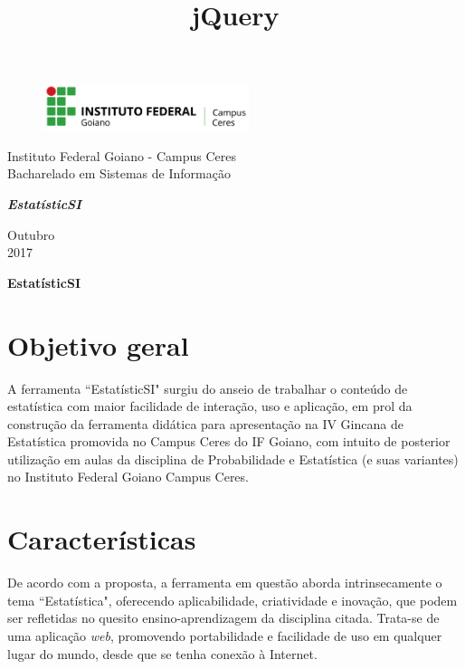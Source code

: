 \documentclass[12pt,a4paper]{article}
\title{jQuery}
\begin{document}
\begin{titlepage}

\begin{center}
\begin{figure}[htb]
		
		\label{figura:LogoIF}
	
		\centering
		\includegraphics[width=6cm]{logo.png} 
\end{figure}


Instituto Federal Goiano - Campus Ceres\\
Bacharelado em Sistemas de Informação\\\vspace{8.0cm}

\textit{\textbf{\Large{EstatísticSI}}}\\\vspace{8.5cm}

Outubro\\
2017\\
\end{center}
\end{titlepage}

\tableofcontents

\newpage
\begin{center}
\textbf{\Large{EstatísticSI}}\\\vspace{0.5cm}
\end{center}
\section{Objetivo geral}%

A ferramenta ``EstatísticSI"  surgiu do anseio de trabalhar o conteúdo de estatística com maior facilidade de interação, uso e aplicação, em prol da construção da ferramenta didática para apresentação na IV Gincana de Estatística promovida no Campus Ceres do IF Goiano, com intuito de posterior utilização em aulas da disciplina de Probabilidade e Estatística (e suas variantes) no Instituto Federal Goiano Campus Ceres.

\section{Características}%

De acordo com a proposta, a ferramenta em questão aborda intrinsecamente o tema ``Estatística", oferecendo aplicabilidade, criatividade e inovação, que podem ser refletidas no quesito ensino-aprendizagem da disciplina citada. Trata-se de uma aplicação \textit{web}, promovendo portabilidade e facilidade de uso em qualquer lugar do mundo, desde que se tenha conexão à Internet. 
\end{document}
